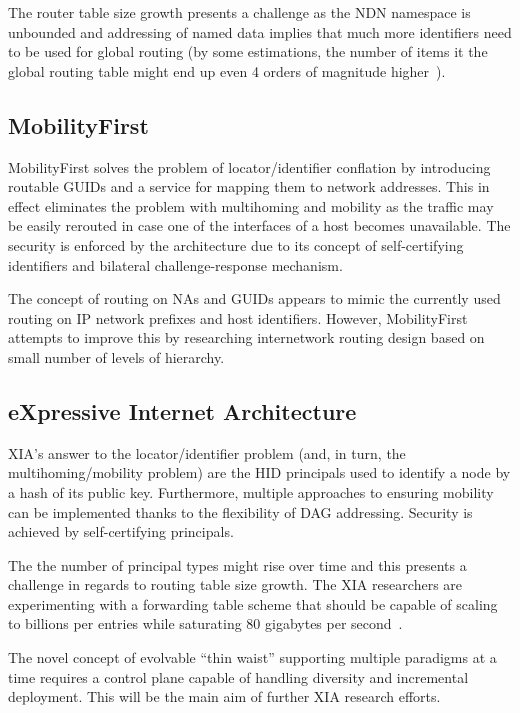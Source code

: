             The router table size growth presents a challenge as the NDN namespace is unbounded and addressing of named data implies that much more identifiers need to be used for global routing (by some estimations, the number of items it the global routing table might end up even 4 orders of magnitude higher~\cite{NDNvsMF}).

        \subsection{MobilityFirst}

            MobilityFirst solves the problem of locator/identifier conflation by introducing routable GUIDs and a service for mapping them to network addresses. This in effect eliminates the problem with multihoming and mobility as the traffic may be easily rerouted in case one of the interfaces of a host becomes unavailable. The security is enforced by the architecture due to its concept of self-certifying identifiers and bilateral challenge-response mechanism.

            The concept of routing on NAs and GUIDs appears to mimic the currently used routing on IP network prefixes and host identifiers. However, MobilityFirst attempts to improve this by researching internetwork routing design based on small number of levels of hierarchy.

        \subsection{eXpressive Internet Architecture}

            XIA's answer to the locator/identifier problem (and, in turn, the multihoming/mobility problem) are the HID principals used to identify a node by a hash of its public key. Furthermore, multiple approaches to ensuring mobility can be implemented thanks to the flexibility of DAG addressing. Security is achieved by self-certifying principals.

            The the number of principal types might rise over time and this presents a challenge in regards to routing table size growth. The XIA researchers are experimenting with a forwarding table scheme that should be capable of scaling to billions per entries while saturating 80 gigabytes per second~\cite{xia}.

            The novel concept of evolvable ``thin waist'' supporting multiple paradigms at a time requires a control plane capable of handling diversity and incremental deployment. This will be the main aim of further XIA research efforts.

